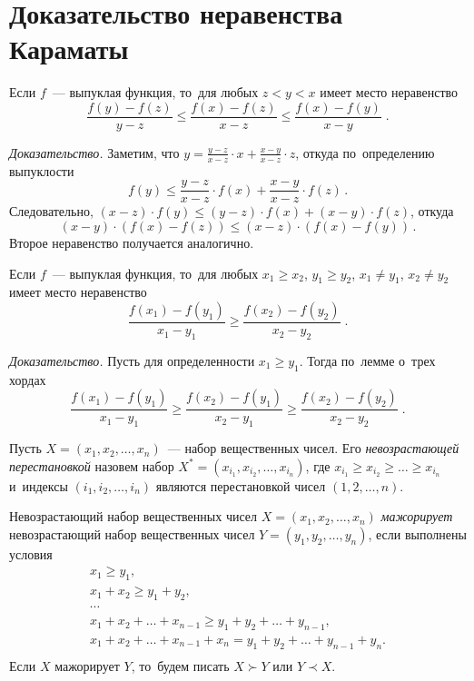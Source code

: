 

\section*{Доказательство неравенства Караматы}


Если $f$~--- выпуклая функция, то~для любых $z < y < x$ имеет место неравенство
\[
    \frac{f(y) - f(z)}{y - z}
\leq
    \frac{f(x) - f(z)}{x - z}
\leq
    \frac{f(x) - f(y)}{x - y}
\; . \]

\textit{Доказательство.}
Заметим, что %
\(
    y = \frac{y - z}{x - z} \cdot x + \frac{x - y}{x - z} \cdot z
\),
откуда по~определению выпуклости
\[
    f(y)
\leq
    \frac{y - z}{x - z} \cdot f(x) + \frac{x - y}{x - z} \cdot f(z)
\, . \]
Следовательно,
$(x - z) \cdot f(y) \leq (y - z) \cdot f(x) + (x - y) \cdot f(z)$,
откуда
\[
    (x - y) \cdot (f(x) - f(z))
\leq
    (x - z) \cdot (f(x) - f(y))
\, . \]
Второе неравенство получается аналогично.

Если $f$~--- выпуклая функция, то~для любых
$x_1 \geq x_2$, $y_1 \geq y_2$, $x_1 \neq y_1$, $x_2 \neq y_2$ имеет место
неравенство
\[
    \frac{f(x_1) - f(y_1)}{x_1 - y_1}
\geq
    \frac{f(x_2) - f(y_2)}{x_2 - y_2}
\; . \]

\textit{Доказательство.}
Пусть для определенности $x_1 \geq y_1$.
Тогда по~лемме о~трех хордах
\[
    \frac{f(x_1) - f(y_1)}{x_1 - y_1}
\geq
    \frac{f(x_2) - f(y_1)}{x_2 - y_1}
\geq
    \frac{f(x_2) - f(y_2)}{x_2 - y_2}
\; . \]

Пусть $X = (x_1, x_2, \ldots, x_n)$~--- набор вещественных чисел.
Его \emph{невозрастающей перестановкой} назовем набор
$X^* = (x_{i_1}, x_{i_2}, \ldots, x_{i_n})$, где
$x_{i_1} \geq x_{i_2} \geq \ldots \geq x_{i_n}$
и~индексы $(i_1, i_2, \ldots, i_n)$ являются перестановкой чисел
$(1, 2, \ldots, n)$.

Невозрастающий набор вещественных чисел $X = (x_1, x_2, \ldots, x_n)$
\emph{мажорирует}
невозрастающий набор вещественных чисел $Y = (y_1, y_2, \ldots, y_n)$,
если выполнены условия
\begin{gather*}
    x_1 \geq y_1
,\\
    x_1 + x_2 \geq y_1 + y_2
,\\ \cdots \\
    x_1 + x_2 + \ldots + x_{n-1} \geq y_1 + y_2 + \ldots + y_{n-1}
,\\
    x_1 + x_2 + \ldots + x_{n-1} + x_n = y_1 + y_2 + \ldots + y_{n-1} + y_n
.\\
\end{gather*}
Если $X$ мажорирует $Y$, то~будем писать $X \succ Y$ или $Y \prec X$.


